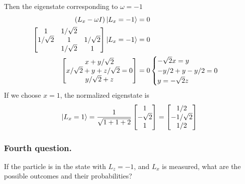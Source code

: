 \documentclass[../../../main.tex]{subfiles}
\begin{document}
Then the eigenstate corresponding to $\omega=-1$
\begin{align*}
    \left( L_x -\omega I  \right) \ket{L_x=-1}&= 0\\
    \begin{bmatrix}
        1& 1/\sqrt{2 }& \\
        1/\sqrt{2}&1 &1/\sqrt{2} \\
        & 1/\sqrt{2}&1 \\
    \end{bmatrix}
    \ket{L_x=-1}&= 0\\
    \begin{bmatrix}
        x+y/\sqrt{2}\\
        x/\sqrt{2 }+y+z/\sqrt{2}=0\\
        y/\sqrt{2 }+z\\
    \end{bmatrix}
    &= 0
    \begin{cases}
        - \sqrt{2}x=y\\
        -y/2+y-y/2=0\\
        y=-\sqrt{2}z\\
    \end{cases}
\end{align*}
If we choose $x=1$, the normalized eigenstate is
\begin{equation*}
    \ket{L_x=1}=
    \frac{1}{\sqrt{1+1+2}}
    \begin{bmatrix}
        1\\
        -\sqrt{2}\\
        1\\
    \end{bmatrix}
    =
        \begin{bmatrix}
        1/2\\
        -1/\sqrt{2}\\
        1/2\\
    \end{bmatrix}
\end{equation*}

\subsubsection{Fourth question.}
If the particle is in the state with $L_z = -1$, and $L_x$ is measured, what are the possible outcomes and their probabilities?
\end{document}

